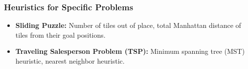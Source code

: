 \documentclass[8pt]{article}
\begin{document}
\subsubsection{Heuristics for Specific Problems}
\begin{itemize}
    \item \textbf{Sliding Puzzle:} Number of tiles out of place, total Manhattan distance of tiles from their goal positions.
    \item \textbf{Traveling Salesperson Problem (TSP):} Minimum spanning tree (MST) heuristic, nearest neighbor heuristic.
\end{itemize}
\end{document}
